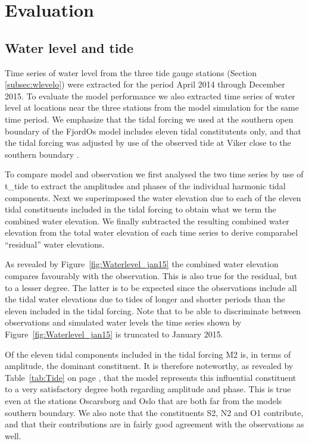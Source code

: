 \section{Evaluation}
\label{sec:evalu}
\subsection{Water level and tide}
\label{subsec:wlevele}
Time series of water level from the three tide gauge stations (Section \ref{subsec:wlevelo}) were extracted for the period April 2014 through December 2015. To evaluate the model performance we also extracted time series of water level at locations near the three stations from the model simulation for the same time period. We emphasize that the tidal forcing we used at the southern open boundary of the FjordOs model includes eleven tidal constitutents only, and that the tidal forcing was adjusted by use of the observed tide at Viker close to the southern boundary \citep{roed:etal:2016}. 

To compare model and observation we first analysed the two time series by use of t\_tide \citep{pavlo:etal:2002} to extract the amplitudes and phases of the individual harmonic tidal components. Next we superimposed the water elevation due to each of the eleven tidal constituents included in the tidal forcing to obtain what we term the combined water elevation. We finally subtracted the resulting combined water elevation from the total water elevation of each time series to derive comparabel ``residual'' water elevations. 

As revealed by Figure~\ref{fig:Waterlevel_jan15} the combined water elevation compares favourably with the observation. This is also true for the residual, but to a lesser degree. The latter is to be expected since the observations include all the tidal water elevations due to tides of longer and shorter periods than the eleven included in the tidal forcing. Note that to be able to discriminate between observations and simulated water levels the time series shown by Figure~\ref{fig:Waterlevel_jan15} is truncated to January 2015.


Of the eleven tidal components included in the tidal forcing M2 is, in terms of amplitude, the dominant constituent. It is therefore noteworthy, as revealed by Table~\ref{tab:Tide} on page \pageref{tab:Tide}, that the model represents this influential constituent to a very satisfactory degree both regarding amplitude and phase. This is true even at the stations Oscarsborg and Oslo that are both far from the models southern boundary. We also note that the constituents S2, N2 and O1 contribute, and that their contributions are in fairly good agreement with the observations as well. 


